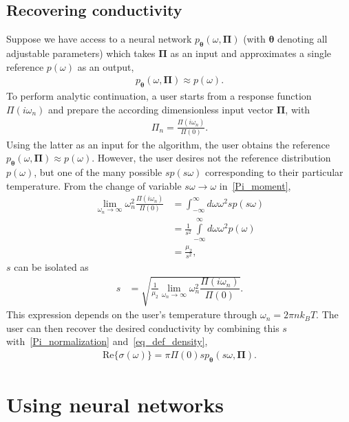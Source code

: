 \documentclass[notitlepage,11pt,nofootinbib]{revtex4-1}
\renewcommand{\vec}[1]{\bm{#1}}
\begin{document}
\subsection{Recovering conductivity}
\label{sec_usage}
Suppose we have access to a neural network $p_{\vec\theta}(\omega,\vec\Pi)$ (with $\vec \theta$ denoting all adjustable parameters) which takes $\vec \Pi$ as an input and approximates a single reference $p(\omega)$ as an output,
\begin{align}
p_{\vec\theta}(\omega,\vec \Pi)\approx p(\omega).
\end{align}
To perform analytic continuation, a user starts from a response function $\Pi(i\omega_n)$ and prepare the according dimensionless input vector $\vec \Pi$, with
\begin{align}
\Pi_n = \frac{\Pi(i\omega_n)}{\Pi(0)}.
\end{align}
Using the latter as an input for the algorithm, the user obtains the reference $p_{\vec\theta}(\omega,\vec \Pi)\approx p(\omega)$. However, the user desires not the reference distribution $p(\omega)$, but one of the many possible $sp(s\omega)$ corresponding to their particular temperature. 
From the change of variable $s\omega\rightarrow \omega$ in~\eqref{Pi_moment},
\begin{align}
    \lim_{\omega_n\rightarrow\infty}\omega_n^2
    \frac{\Pi(i\omega_n)}{\Pi(0)}
    &=
    \int_{-\infty}^{\infty}d\omega \omega^2 sp(s\omega)
    \\
    &=
\frac{1}{s^2}
\int\limits_{-\infty}^{\infty}d\omega \omega^2 p(\omega)
\\
&= \frac{\mu_2}{s^2},
\end{align}
$s$ can be isolated as 
\begin{align}
s
&=
\sqrt{
    \frac{1}{\mu_2}
    \lim\limits_{\omega_n\rightarrow\infty}\omega_n^2
    \dfrac{\Pi(i\omega_n)}{\Pi(0)}
    }.
    \label{user_s}
\end{align}
This expression depends on the user's temperature through $\omega_n = 2\pi n k_B T$. 
The user can then recover the desired conductivity by combining this $s$ with~\eqref{Pi_normalization} and~\eqref{eq_def_density},
\begin{align}
\text{Re}\{ \sigma(\omega) \} = \pi\Pi(0) 
s p_{\vec \theta}(s\omega, \vec \Pi).
\end{align}



\section{Using neural networks}
\end{document}
